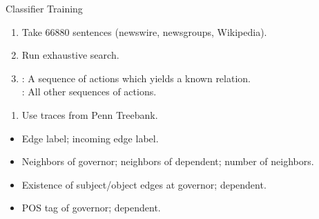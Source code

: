 \def\title{Classifier Training}
\begin{frame}[noframenumbering]{\title}
\begin{enumerate}
  \item Take \num{66880} sentences (newswire, newsgroups, Wikipedia).
  \item Run exhaustive search.
  \item {}: A sequence of actions which yields a known relation. \\
        : All other sequences of actions.
\end{enumerate}
\hspace{0.5em}
\pause

\begin{enumerate}
  \item Use traces from Penn Treebank.
\end{enumerate}
\hspace{0.5em}
\pause

\begin{itemize}
  \item Edge label; incoming edge label.
  \item Neighbors of governor; neighbors of dependent; number of neighbors.
  \item Existence of subject/object edges at governor; dependent.
  \item POS tag of governor; dependent.
\end{itemize}
\end{frame}
